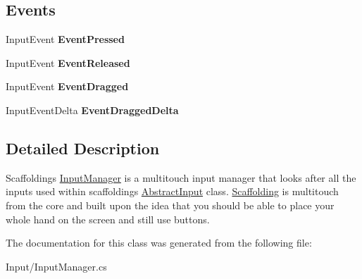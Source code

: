 \subsection*{Events}
\begin{DoxyCompactItemize}
\item 
\hypertarget{class_scaffolding_1_1_input_manager_a0cd2afadd2f9bf461269497b0ba988ef}{Input\-Event {\bfseries Event\-Pressed}}\label{class_scaffolding_1_1_input_manager_a0cd2afadd2f9bf461269497b0ba988ef}

\item 
\hypertarget{class_scaffolding_1_1_input_manager_a2ea3e35f371d9777d16174216a156ba9}{Input\-Event {\bfseries Event\-Released}}\label{class_scaffolding_1_1_input_manager_a2ea3e35f371d9777d16174216a156ba9}

\item 
\hypertarget{class_scaffolding_1_1_input_manager_af97450c838114a179c136de954764955}{Input\-Event {\bfseries Event\-Dragged}}\label{class_scaffolding_1_1_input_manager_af97450c838114a179c136de954764955}

\item 
\hypertarget{class_scaffolding_1_1_input_manager_a9317d8d6bb537c1614c925390c1442a5}{Input\-Event\-Delta {\bfseries Event\-Dragged\-Delta}}\label{class_scaffolding_1_1_input_manager_a9317d8d6bb537c1614c925390c1442a5}

\end{DoxyCompactItemize}


\subsection{Detailed Description}
Scaffoldings \hyperlink{class_scaffolding_1_1_input_manager}{Input\-Manager} is a multitouch input manager that looks after all the inputs used within scaffoldings \hyperlink{class_scaffolding_1_1_abstract_input}{Abstract\-Input} class. \hyperlink{namespace_scaffolding}{Scaffolding} is multitouch from the core and built upon the idea that you should be able to place your whole hand on the screen and still use buttons. 



The documentation for this class was generated from the following file\-:\begin{DoxyCompactItemize}
\item 
Input/Input\-Manager.\-cs\end{DoxyCompactItemize}

